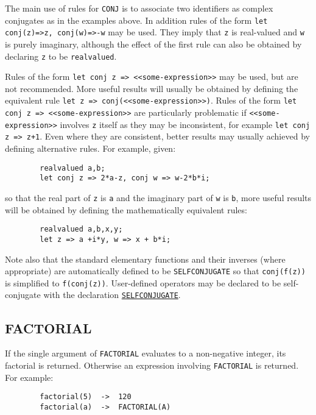 The main use of rules for \texttt{CONJ} is to associate two identifiers
as complex conjugates as in the examples above. In addition rules of the form
\texttt{let conj(z)=>z, conj(w)=>-w} may be used. They imply that
\texttt{z} is real-valued and \texttt{w} is purely imaginary, although
the effect of the first rule can also be obtained by declaring \texttt{z}
to be \texttt{realvalued}.

Rules of the form \texttt{let conj z => <<some-expression>>} may be used,
but are not recommended. More useful results will usually be obtained by
defining the equivalent rule \texttt{let z => conj(<<some-expression>>)}.
Rules of the form \texttt{let conj z => <<some-expression>>} are particularly
problematic if \texttt{<<some-expression>>} involves \texttt{z} itself as
they may be inconsistent, for example \texttt{let conj z => z+1}. Even where
they are consistent, better results may usually achieved by defining alternative rules.
For example, given:
\begin{verbatim}
        realvalued a,b;
        let conj z => 2*a-z, conj w => w-2*b*i;
\end{verbatim}
so that the real part of \texttt{z} is \texttt{a} and the imaginary part
of \texttt{w} is \texttt{b}, more useful results will be obtained by
defining the mathematically equivalent rules:
\begin{verbatim}
        realvalued a,b,x,y;
        let z => a +i*y, w => x + b*i;
\end{verbatim}

Note also that the standard elementary functions and their inverses
(where appropriate) are automatically defined to be
\texttt{SELFCONJUGATE} so that
\texttt{conj(f(z))} is simplified to \texttt{f(conj(z))}. User-defined
operators may be declared to be self-conjugate with the declaration
\hyperlink{command:SELFCONJUGATE}{\texttt{SELFCONJUGATE}}.

\subsection{FACTORIAL}
\hypertarget{operator:FACTORIAL}{}

If the single argument of \texttt{FACTORIAL} evaluates to a non-negative
integer, its factorial is returned.  Otherwise an expression involving
\texttt{FACTORIAL} is returned. For example:
\begin{verbatim}
        factorial(5)  ->  120
        factorial(a)  ->  FACTORIAL(A)
\end{verbatim}

